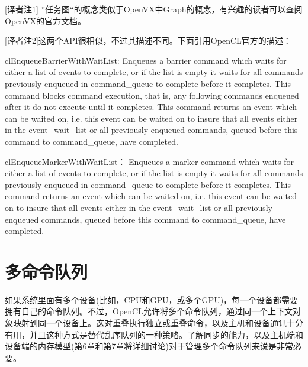 \begin{myRefs}

[译者注1] ”任务图“的概念类似于OpenVX中Graph的概念，有兴趣的读者可以查阅OpenVX的官方文档。

[译者注2]这两个API很相似，不过其描述不同。下面引用OpenCL官方的描述：

\begin{myQuote}
clEnqueueBarrierWithWaitList: Enqueues a barrier command which waits for either a list of events to complete, or if the list is empty it waits for all commands previously enqueued in command\_\allowbreak{}queue to complete before it completes. This command blocks command execution, that is, any following commands enqueued after it do not execute until it completes. This command returns an event which can be waited on, i.e. this event can be waited on to insure that all events either in the event\_\allowbreak{}wait\_\allowbreak{}list or all previously enqueued commands, queued before this command to command\_\allowbreak{}queue, have completed.
\end{myQuote}

\begin{myQuote}
clEnqueueMarkerWithWaitList： Enqueues a marker command which waits for either a list of events to complete, or if the list is empty it waits for all commands previously enqueued in command\_\allowbreak{}queue to complete before it completes. This command returns an event which can be waited on, i.e. this event can be waited on to insure that all events either in the event\_\allowbreak{}wait\_\allowbreak{}list or all previously enqueued commands, queued before this command to command\_\allowbreak{}queue, have completed.
\end{myQuote}

\end{myRefs}



\section{多命令队列}

如果系统里面有多个设备(比如，CPU和GPU，或多个GPU)，每一个设备都需要拥有自己的命令队列。不过，OpenCL允许将多个命令队列，通过同一个上下文对象映射到同一个设备上。这对重叠执行独立或重叠命令，以及主机和设备通讯十分有用，并且这种方式是替代乱序队列的一种策略。了解同步的能力，以及主机端和设备端的内存模型(第6章和第7章将详细讨论)对于管理多个命令队列来说是非常必要。

